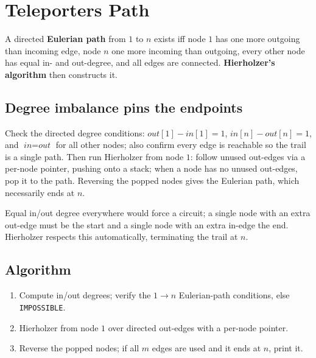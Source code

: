 \section{Teleporters Path}
\label{sec:cses-teleporters-path}


\begin{patternbox}
A directed \textbf{Eulerian path} from $1$ to $n$ exists iff node $1$ has
one more outgoing than incoming edge, node $n$ one more incoming than
outgoing, every other node has equal in- and out-degree, and all edges are
connected. \textbf{Hierholzer's algorithm} then constructs it.
\end{patternbox}

\subsection*{Degree imbalance pins the endpoints}

Check the directed degree conditions: $\textit{out}[1]-\textit{in}[1]=1$,
$\textit{in}[n]-\textit{out}[n]=1$, and $\textit{in}=\textit{out}$ for all
other nodes; also confirm every edge is reachable so the trail is a single
path. Then run Hierholzer from node $1$: follow unused out-edges via a
per-node pointer, pushing onto a stack; when a node has no unused out-edges,
pop it to the path. Reversing the popped nodes gives the Eulerian path,
which necessarily ends at $n$.

\begin{ideabox}
Equal in/out degree everywhere would force a circuit; a single node with an
extra out-edge must be the start and a single node with an extra in-edge the
end. Hierholzer respects this automatically, terminating the trail at $n$.
\end{ideabox}

\subsection*{Algorithm}

\begin{enumerate}
  \item Compute in/out degrees; verify the $1\to n$ Eulerian-path
        conditions, else \texttt{IMPOSSIBLE}.
  \item Hierholzer from node $1$ over directed out-edges with a per-node
        pointer.
  \item Reverse the popped nodes; if all $m$ edges are used and it ends at
        $n$, print it.
\end{enumerate}

